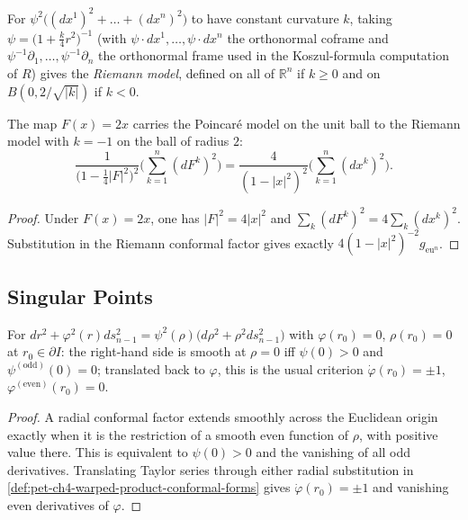 \begin{remark}
  \label{rem:pet-ch4-riemann-model}
  For $\psi^2\big((dx^1)^2+\dots+(dx^n)^2\big)$ to have constant curvature $k$,
  taking $\psi=\big(1+\tfrac k4r^2\big)^{-1}$ (with $\psi\cdot dx^1,\dots,\psi\cdot dx^n$
  the orthonormal coframe and $\psi^{-1}\partial_1,\dots,\psi^{-1}\partial_n$ the
  orthonormal frame used in the Koszul-formula computation of $R$) gives the
  \emph{Riemann model}, defined on all of $\mathbb{R}^n$ if $k\ge0$ and on
  $B(0,2/\sqrt{|k|})$ if $k<0$.
\end{remark}

\begin{proposition}[the Riemann model with $k=-1$ is isometric to the Poincaré model]
  \label{prop:pet-ch4-riemann-poincare-isometric}
  The map $F(x)=2x$ carries the Poincaré model on the unit ball to the Riemann
  model with $k=-1$ on the ball of radius $2$:
  \[
    \frac1{\big(1-\tfrac14|F|^2\big)^2}\Big(\sum_{k=1}^n(dF^k)^2\Big)
    =\frac4{(1-|x|^2)^2}\Big(\sum_{k=1}^n(dx^k)^2\Big).
  \]
\end{proposition}
\begin{proof}
  \sketch
  Under $F(x)=2x$, one has $|F|^2=4|x|^2$ and
  $\sum_k(dF^k)^2=4\sum_k(dx^k)^2$. Substitution in the Riemann conformal factor
  gives exactly $4(1-|x|^2)^{-2}g_{\mathrm{eu}^n}$.
\end{proof}

\subsection{Singular Points}

\begin{proposition}
  \label{prop:pet-ch4-conformal-smoothness-criterion}
  For $dr^2+\varphi^2(r)ds_{n-1}^2=\psi^2(\rho)\big(d\rho^2+\rho^2ds_{n-1}^2\big)$
  with $\varphi(r_0)=0$, $\rho(r_0)=0$ at $r_0\in\partial I$: the right-hand side
  is smooth at $\rho=0$ iff $\psi(0)>0$ and $\psi^{(\mathrm{odd})}(0)=0$; translated
  back to $\varphi$, this is the usual criterion $\dot\varphi(r_0)=\pm1$,
  $\varphi^{(\mathrm{even})}(r_0)=0$.
\end{proposition}
\begin{proof}
  \sketch
  A radial conformal factor extends smoothly across the Euclidean origin exactly
  when it is the restriction of a smooth even function of $\rho$, with positive
  value there. This is equivalent to $\psi(0)>0$ and the vanishing of all odd
  derivatives. Translating Taylor series through either radial substitution in
  \cref{def:pet-ch4-warped-product-conformal-forms} gives
  $\dot\varphi(r_0)=\pm1$ and vanishing even derivatives of $\varphi$.
\end{proof}

